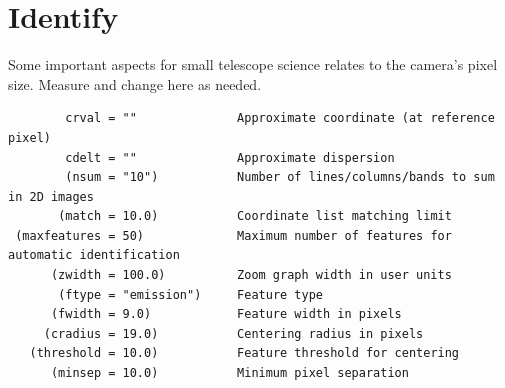 
\renewcommand{\footerfilename}{IdentifyLPARS.tex}

\section{Identify}

Some important aspects for small telescope science relates to the
camera's pixel size. Measure and change here as needed.

\begingroup \fontsize{10pt}{10pt}
\selectfont
\begin{verbatim} 
        crval = ""              Approximate coordinate (at reference pixel)
        cdelt = ""              Approximate dispersion
        (nsum = "10")           Number of lines/columns/bands to sum in 2D images
       (match = 10.0)           Coordinate list matching limit
 (maxfeatures = 50)             Maximum number of features for automatic identification
      (zwidth = 100.0)          Zoom graph width in user units
       (ftype = "emission")     Feature type
      (fwidth = 9.0)            Feature width in pixels
     (cradius = 19.0)           Centering radius in pixels
   (threshold = 10.0)           Feature threshold for centering
      (minsep = 10.0)           Minimum pixel separation
\end{verbatim}
\endgroup

